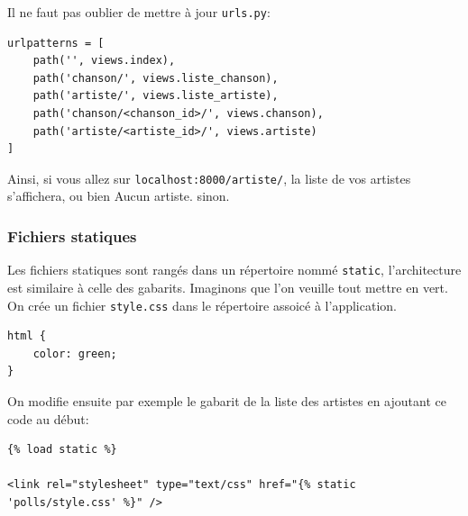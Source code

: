 \documentclass[a4paper, 10pt]{article}
\newcommand{\code}[1]{{\small\texttt{#1}}}
\begin{document}
Il ne faut pas oublier de mettre à jour \code{urls.py}:
\begin{verbatim}
urlpatterns = [
    path('', views.index),
    path('chanson/', views.liste_chanson),
    path('artiste/', views.liste_artiste),
    path('chanson/<chanson_id>/', views.chanson),
    path('artiste/<artiste_id>/', views.artiste)
]
\end{verbatim}

Ainsi, si vous allez sur \code{localhost:8000/artiste/}, la liste de vos artistes s'affichera, ou bien \og Aucun artiste. \fg{} sinon.

\subsubsection{Fichiers statiques}

Les fichiers statiques sont rangés dans un répertoire nommé \code{static}, l'architecture est similaire à celle des gabarits. Imaginons que l'on veuille tout mettre en vert. On crée un fichier \code{style.css} dans le répertoire assoicé à l'application.

\begin{verbatim}
html {
    color: green;
}
\end{verbatim}

On modifie ensuite par exemple le gabarit de la liste des artistes en ajoutant ce code au début:
\begin{verbatim}
{% load static %}

<link rel="stylesheet" type="text/css" href="{% static 'polls/style.css' %}" />
\end{verbatim}
\end{document}
